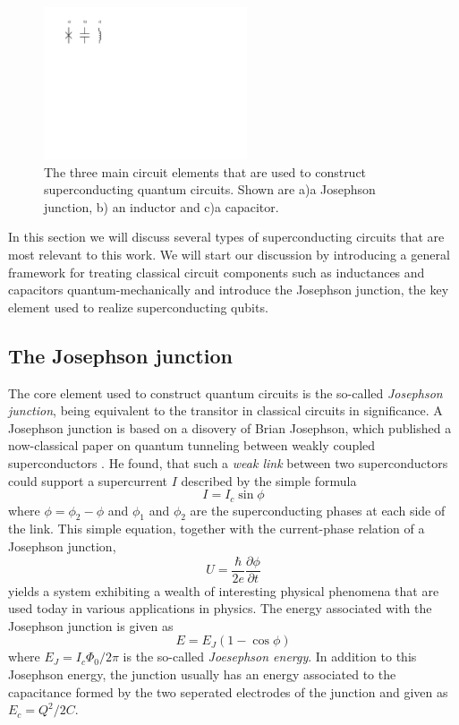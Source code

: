 \begin{figure}
	\includegraphics[width=6cm]{"./material/figures/introduction/circuit_elements"}
	\caption{The three main circuit elements that are used to construct superconducting quantum circuits. Shown are a)a Josephson junction, b) an inductor and c)a capacitor.}
	\label{fig:SuperconductingCircuitElements}
\end{figure}

In this section we will discuss several types of superconducting circuits that are most relevant to this work. We will start our discussion by introducing a general framework for treating classical circuit components such as inductances and capacitors quantum-mechanically and introduce the Josephson junction, the key element used to realize superconducting qubits.

\subsection{The Josephson junction}

The core element used to construct quantum circuits is the so-called {\it Josephson junction}, being equivalent to the transitor in classical circuits in significance. A Josephson junction is based on a disovery of Brian Josephson, which published a now-classical paper on quantum tunneling between weakly coupled superconductors \citep{josephson_possible_1962}. He found, that such a {\it weak link} between two superconductors could support a supercurrent $I$ described by the simple formula
%
\begin{equation}
I = I_c\sin{\phi}
\end{equation}
%
where $\phi = \phi_2-\phi$ and $\phi_1$ and $\phi_2$ are the superconducting phases at each side of the link. This simple equation, together with the current-phase relation of a Josephson junction,
%
\begin{equation}
U = \frac{\hbar}{2e}\frac{\partial \phi}{\partial t}
\end{equation}
%
yields a system exhibiting a  wealth of interesting physical phenomena that are used today in various applications in physics. The energy associated with the Josephson junction is given as
%
\begin{equation}
E = E_J(1-\cos{\phi})
\end{equation}
%
where $E_J = I_c \Phi_0/2\pi$ is the so-called {\it Joesephson energy}. In addition to this Josephson energy, the junction usually has an energy associated to the capacitance formed by the two seperated electrodes of the junction and given as $E_c = Q^2/2C$. 

